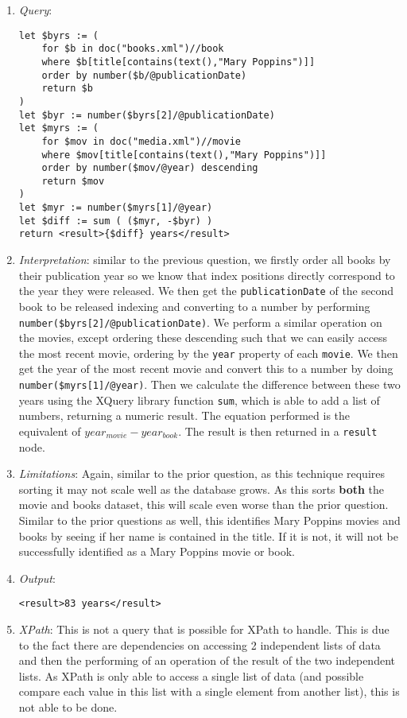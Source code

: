 \documentclass[11pt]{article}
\begin{document}
\begin{enumerate}
\item \textit{Query}:
\begin{small}
\begin{verbatim}
let $byrs := ( 
    for $b in doc("books.xml")//book 
    where $b[title[contains(text(),"Mary Poppins")]] 
    order by number($b/@publicationDate) 
    return $b 
) 
let $byr := number($byrs[2]/@publicationDate) 
let $myrs := ( 
    for $mov in doc("media.xml")//movie 
    where $mov[title[contains(text(),"Mary Poppins")]] 
    order by number($mov/@year) descending 
    return $mov 
) 
let $myr := number($myrs[1]/@year) 
let $diff := sum ( ($myr, -$byr) ) 
return <result>{$diff} years</result>
\end{verbatim}
\end{small}
\item \textit{Interpretation}: similar to the previous question, we firstly order all books by their publication year so we know that index positions directly correspond to the year they were released. We then get the \texttt{publicationDate} of the second book to be released indexing and converting to a number by performing \texttt{number(\$byrs[2]/@publicationDate)}. We perform a similar operation on the movies, except ordering these descending such that we can easily access the most recent movie, ordering by the \texttt{year} property of each \texttt{movie}. We then get the year of the most recent movie and convert this to a number by doing \texttt{number(\$myrs[1]/@year)}. Then we calculate the difference between these two years using the XQuery library function \texttt{sum}, which is able to add a list of numbers, returning a numeric result. The equation performed is the equivalent of $year_{movie}-year_{book}$. The result is then returned in a \texttt{result} node.
\item \textit{Limitations}: Again, similar to the prior question, as this technique requires sorting it may not scale well as the database grows. As this sorts \textbf{both} the movie and books dataset, this will scale even worse than the prior question. Similar to the prior questions as well, this identifies Mary Poppins movies and books by seeing if her name is contained in the title. If it is not, it will not be successfully identified as a Mary Poppins movie or book.
\item \textit{Output}:
\begin{verbatim}
<result>83 years</result>
\end{verbatim} 
\item \textit{XPath}: This is not a query that is possible for XPath to handle. This is due to the fact there are dependencies on accessing 2 independent lists of data and then the performing of an operation of the result of the two independent lists. As XPath is only able to access a single list of data (and possible compare each value in this list with a single element from another list), this is not able to be done.
\end{enumerate}



\end{document}
